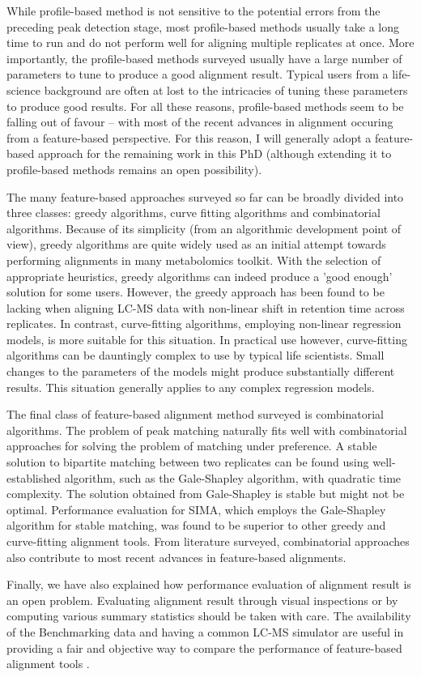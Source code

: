 While profile-based method is not sensitive to the potential errors from the preceding peak detection stage, most profile-based methods usually take a long time to run and do not perform well for aligning multiple replicates at once. More importantly, the profile-based methods surveyed usually have a large number of parameters to tune to produce a good alignment result. Typical users from a life-science background are often at lost to the intricacies of tuning these parameters to produce good results. For all these reasons, profile-based methods seem to be falling out of favour -- with most of the recent advances in alignment occuring from a feature-based perspective. For this reason, I will generally adopt a feature-based approach for the remaining work in this PhD (although extending it to profile-based methods remains an open possibility).

The many feature-based approaches surveyed so far can be broadly divided into three classes: greedy algorithms, curve fitting algorithms and combinatorial algorithms. Because of its simplicity (from an algorithmic development point of view), greedy algorithms are quite widely used as an initial attempt towards performing alignments in many metabolomics toolkit. With the selection of appropriate heuristics, greedy algorithms can indeed produce a 'good enough' solution for some users. However, the greedy approach has been found to be lacking when aligning LC-MS data with non-linear shift in retention time across replicates. In contrast, curve-fitting algorithms, employing non-linear regression models, is more suitable for this situation. In practical use however, curve-fitting algorithms can be dauntingly complex to use by typical life scientists. Small changes to the parameters of the models might produce substantially different results. This situation generally applies to any complex regression models.

The final class of feature-based alignment method surveyed is combinatorial algorithms. The problem of peak matching naturally fits well with combinatorial approaches for solving the problem of matching under preference. A stable solution to bipartite matching between two replicates can be found using well-established algorithm, such as the Gale-Shapley algorithm, with quadratic time complexity. The solution obtained from Gale-Shapley is stable but might not be optimal. Performance evaluation for SIMA, which employs the Gale-Shapley algorithm for stable matching, was found to be superior to other greedy and curve-fitting alignment tools. From literature surveyed, combinatorial approaches also contribute to most recent advances in feature-based alignments.

Finally, we have also explained how performance evaluation of alignment result is an open problem. Evaluating alignment result through visual inspections or by computing various summary statistics should be taken with care. The availability of the Benchmarking data and having a common LC-MS simulator are useful in providing a fair and objective way to compare the performance of feature-based alignment tools .
